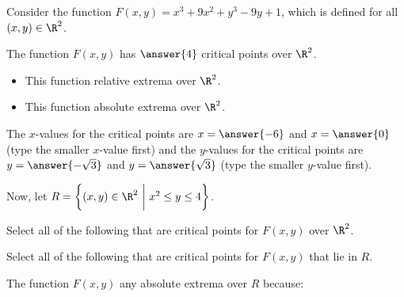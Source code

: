 \documentclass{ximera}
\author{Jim Talamo}
\begin{document}
\begin{exercise}

Consider the function $F(x,y) = x^3+9x^2 + y^3-9y +1$, which is defined for all $(x,y) \in \R^2$.  

The function $F(x,y)$ has $\answer{4}$ critical points over $\R^2$.

\begin{itemize}
\item This function  relative extrema over $\R^2$.
\item This function  absolute extrema over $\R^2$.
\end{itemize}

\begin{exercise}
The $x$-values for the critical points are $x=\answer{-6}$ and $x=\answer{0}$ (type the smaller $x$-value first) and the $y$-values for the critical points are $y=\answer{-\sqrt{3}}$ and $y= \answer{\sqrt{3}}$ (type the smaller $y$-value first).

\begin{exercise}
Now, let $R = \left\{ (x,y) \in \R^2 ~ \bigg| ~ x^2 \leq y \leq 4 \right\}$.

Select all of the following that are critical points for $F(x,y)$ over $\R^2$.

\begin{selectAll}
\end{selectAll}


Select all of the following that are critical points for $F(x,y)$ that lie in $R$.

\begin{selectAll}
\end{selectAll}


The function $F(x,y)$  any absolute extrema over $R$ because:

\begin{selectAll}
\end{selectAll}



\end{exercise}
\end{exercise}
\end{exercise}
\end{document}
